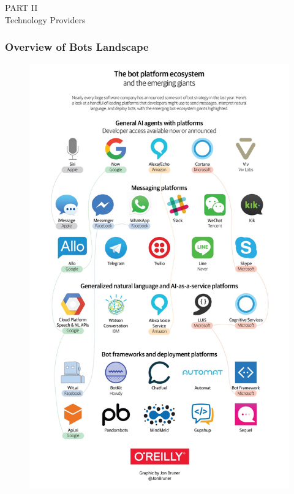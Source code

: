 \documentclass[11pt]{beamer}
\begin{document}
\begin{frame}
\begin{center}
	PART II \\ Technology Providers
\end{center}
\end{frame}

\begin{frame}
\frametitle{Overview of Bots Landscape}
\begin{figure}[h]
	\centering
	\includegraphics[scale=.1]{images/bots-landscape-2017}
\end{figure}
\end{frame}
\end{document}
